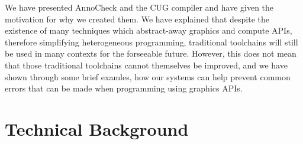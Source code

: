 \documentclass[a4paper,12pt,twoside,openright]{report}
\begin{document}
We have presented AnnoCheck and the CUG compiler and have given the motivation
for why we created them. We have explained that despite the existence of many
techniques which abstract-away graphics and compute APIs, therefore simplifying
heterogeneous programming, traditional toolchains will still be used in many
contexts for the forseeable future. However, this does not mean that those
traditional toolchains cannot themselves be improved, and we have shown through
some brief examles, how our systems can help prevent common errors that can be
made when programming using graphics APIs.

\chapter{Technical Background}

\label{chp:technical_background}





\end{document}
